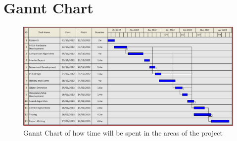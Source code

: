 \chapter{Gannt Chart} \label{Chapter:AppendixD:Gannt}

\begin{figure}
\centering
\includegraphics[angle = 90, width=\textwidth,height=\textheight-7cm,keepaspectratio]{Figures/Gannt.png} 
\caption{Gannt Chart of how time will be spent in the areas of the project}
\label{fig:Gannt}
\end{figure}